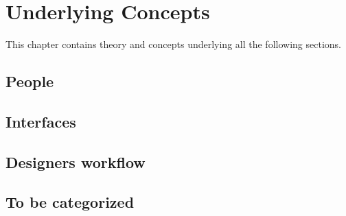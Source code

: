\chapter{Underlying Concepts} \label{chap:concepts}
This chapter contains theory and concepts underlying all the following sections.

\section{People}



\section{Interfaces}


\section{Designers workflow}


\section{To be categorized}
